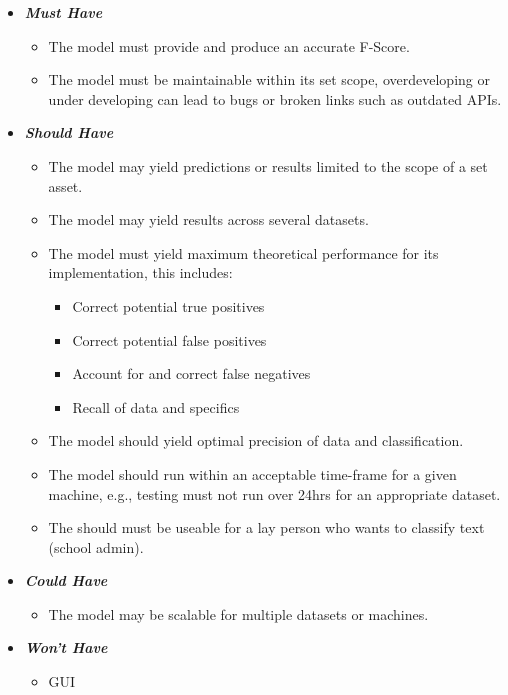 \begin{itemize}
    \item \textbf{\textit{Must Have}}
        \begin{itemize}\label{NFMH}
            \item The model must provide and produce an accurate F-Score.
            \item The model must be maintainable within its set scope, overdeveloping or under developing can lead to bugs or broken links such as outdated APIs.
        \end{itemize}
    \item \textbf{\textit{Should Have}}
        \begin{itemize}\label{NFSH}
            \item The model may yield predictions or results limited to the scope of a set asset.
            \item The model may yield results across several datasets.
            \item The model must yield maximum theoretical performance for its implementation, this includes:
                \begin{itemize}
                    \item Correct potential true positives
                    \item Correct potential false positives
                    \item Account for and correct false negatives
                    \item Recall of data and specifics
                \end{itemize}
            \item The model should yield optimal precision of data and classification.
            \item The model should run within an acceptable time-frame for a given machine, e.g., testing must not run over 24hrs for an appropriate dataset.
            \item The should must be useable for a lay person who wants to classify text (school admin).
        \end{itemize}
    \item \textbf{\textit{Could Have}}
        \begin{itemize}\label{NFCH}
            \item The model may be scalable for multiple datasets or machines.
        \end{itemize}
    \item \textbf{\textit{Won't Have}}
        \begin{itemize}\label{NFWH}
            \item GUI
        \end{itemize}
\end{itemize}

